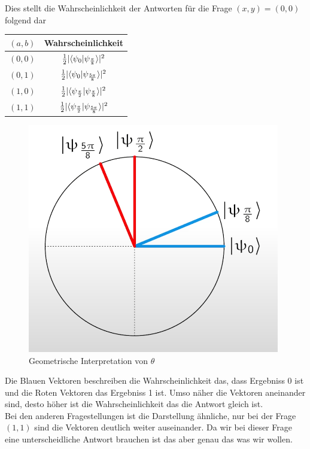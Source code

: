 Dies stellt die Wahrscheinlichkeit der Antworten für die Frage $(x, y) = (0, 0)$ folgend dar\\

\begin{center}
    \begin{tabular}{c|c}
    $(a, b)$ & Wahrscheinlichkeit \\ \hline
    $(0, 0)$ & $\frac{1}{2}\lvert \braket{\psi_0 | \psi_\frac{\pi}{8}} \rvert^2$  \\
    $(0, 1)$ & $\frac{1}{2}\lvert \braket{\psi_0 | \psi_\frac{5\pi}{8}} \rvert^2$  \\
    $(1, 0)$ & $\frac{1}{2}\lvert \braket{\psi_\frac{\pi}{2} | \psi_\frac{\pi}{8}} \rvert^2$  \\
    $(1, 1)$ & $\frac{1}{2}\lvert \braket{\psi_\frac{\pi}{2} | \psi_\frac{5\pi}{8}} \rvert^2$
    \end{tabular}
\end{center}

\begin{figure}[H]
    \centering
    \includegraphics[width=0.6\linewidth]{img/CHSH-geometric.png}
    \caption{Geometrische Interpretation von $\theta$ \protect\cite[1h3m]{IBM_chsh_2025}}
    \label{fig:CHSHGeometric}
\end{figure}

Die Blauen Vektoren beschreiben die Wahrscheinlichkeit das, dass Ergebniss 0 ist und die Roten Vektoren das Ergebniss 1 ist.
Umso näher die Vektoren aneinander sind, desto höher ist die Wahrscheinlichkeit das die Antwort gleich ist.\\

Bei den anderen Fragestellungen ist die Darstellung ähnliche, nur bei der Frage $(1, 1)$ sind die Vektoren deutlich weiter auseinander.
Da wir bei dieser Frage eine unterscheidliche Antwort brauchen ist das aber genau das was wir wollen.\\

